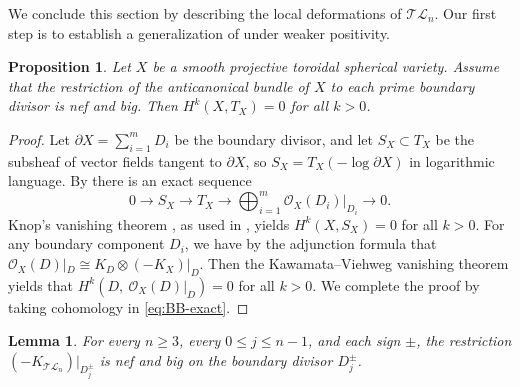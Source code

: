 \documentclass[10pt]{amsart}
\newtheorem{proposition}[theorem]{Proposition}
\newtheorem{lemma}[theorem]{Lemma}
\theoremstyle{definition}
\newcommand{\OO}{\mathcal{O}}
\newcommand{\TL}{\mathcal{TL}}
\theoremstyle{plain} %
\begin{document}
We conclude this section by describing the local deformations of $\TL_n$. Our first step is to establish a generalization of \cite[Proposition 4.2\textup{(iii)}]{BienBrion} under weaker positivity.
\begin{proposition}\label{gbb}
Let $X$ be a smooth projective toroidal spherical variety. Assume that the restriction of the anticanonical bundle of $X$ to each prime boundary divisor is nef and big. Then $H^k(X,T_X)=0$ for all $k>0$.
\end{proposition}
\begin{proof}
Let $\partial X=\sum_{i=1}^{m}D_i$ be the boundary divisor, and let $S_{X}\subset T_{X}$ be the subsheaf of vector fields tangent to $\partial X$, so $S_{X}=T_{X}(-\log\partial X)$ in logarithmic language. By \cite[Proposition~2.3.2]{BienBrion} there is an exact sequence 
\begin{equation}\label{eq:BB-exact}
0\longrightarrow S_{X}\longrightarrow T_{X}\longrightarrow
\bigoplus\nolimits_{i=1}^{m}\OO_{X}(D_i)|_{D_i}
\longrightarrow 0.
\end{equation}
Knop's vanishing theorem \cite[Theorem~4.1]{Knop94}, as used in \cite[Section 4]{BienBrion}, yields
$H^k(X,S_{X})=0$ for all $k>0$.
For any boundary component $D_i$,  we have by the adjunction formula that $\OO_{X}(D)|_D\cong K_D\otimes (-K_{X})|_{D}$.
Then the Kawamata--Viehweg vanishing theorem yields that $H^k\left(D,\ \OO_{X}(D)|_{D}\right)=0$ for all $k>0$. We complete the proof by taking cohomology in \eqref{eq:BB-exact}.
\end{proof}


\begin{lemma}\label{lem:anticanonical-restriction}
For every $n\ge 3$, every $0\le j\le n-1$, and each sign $\pm$, the restriction $(-K_{\TL_n})|_{D_j^\pm}$ is nef and big on the boundary divisor $D_j^\pm$.
\end{lemma}
\end{document}
